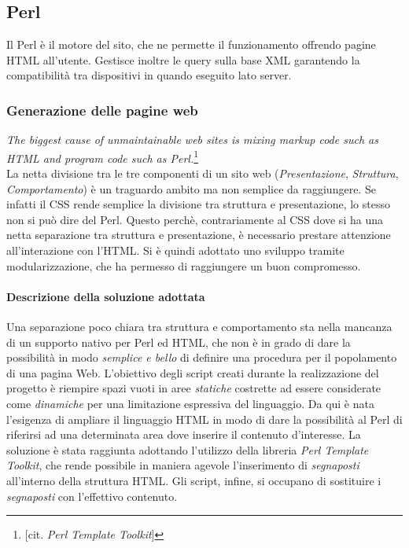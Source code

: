 \subsection{Perl}
Il Perl \`e il motore del sito, che ne permette il funzionamento offrendo pagine HTML all'utente. Gestisce inoltre le query sulla base XML garantendo la compatibilit\`a tra dispositivi in quando eseguito lato server.
\subsubsection{Generazione delle pagine web}
\textit{The biggest cause of unmaintainable web sites is mixing markup code such as HTML and program code such as Perl.}\footnote{[cit. \textit{Perl Template Toolkit}]}\\

La netta divisione tra le tre componenti di un sito web (\textit{Presentazione}, \textit{Struttura}, \textit{Comportamento}) \`e un traguardo ambito ma non semplice da raggiungere. Se infatti il CSS rende semplice la divisione tra struttura e presentazione, lo stesso non si pu\`o dire del Perl. Questo perch\`e, contrariamente al CSS dove si ha una netta separazione tra struttura e presentazione, \`e necessario prestare attenzione all'interazione con l'HTML. Si \`e quindi adottato uno sviluppo tramite modularizzazione, che ha permesso di raggiungere un buon compromesso.

\paragraph*{Descrizione della soluzione adottata}Una separazione poco chiara tra struttura e comportamento sta nella mancanza di un supporto nativo per Perl ed HTML, che non è in grado di dare la possibilit\`a in modo \textit{semplice e bello} di definire una procedura per il popolamento di una pagina Web. L'obiettivo degli script creati durante la realizzazione del progetto \`e riempire spazi vuoti in aree \textit{statiche} costrette ad essere considerate come \textit{dinamiche} per una limitazione espressiva del linguaggio. Da qui \`e nata l'esigenza di ampliare il linguaggio HTML in modo di dare la possibilit\`a al Perl di riferirsi ad una determinata area dove inserire il contenuto d'interesse. La soluzione \`e stata raggiunta adottando l'utilizzo della libreria \textit{Perl Template Toolkit}, che rende possibile in maniera agevole l'inserimento di \textit{segnaposti} all'interno della struttura HTML. Gli script, infine, si occupano di sostituire i \textit{segnaposti} con l'effettivo contenuto.
